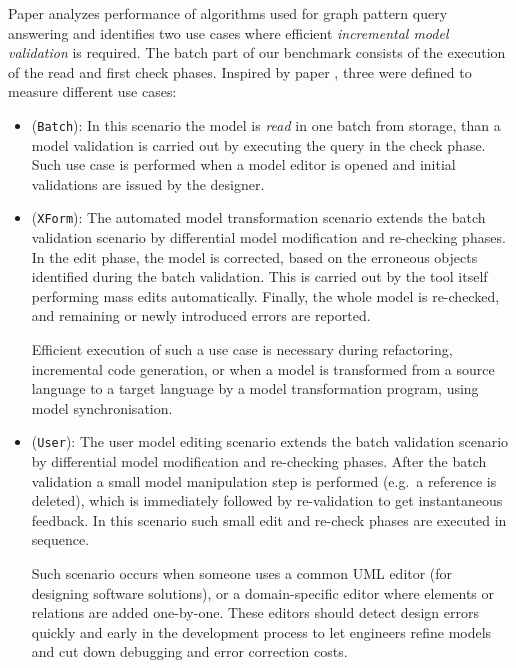 Paper \cite{icgt08-bhrv} analyzes performance of algorithms used for graph
pattern query answering and identifies two use cases where efficient
\emph{incremental model validation} is required. The batch part of our benchmark
consists of the execution of the read and first check phases. Inspired by paper
\cite{icgt08-bhrv}, three  were defined to measure different
use cases:
\begin{itemize}
  
  \item {} (\texttt{Batch}):
  In this scenario the model is \emph{read} in one batch from storage, than a model validation is carried out by executing the query in the check phase. Such use case is performed when a model editor is opened and initial validations are issued by the designer. 
  
  \item {} (\texttt{XForm}):
  The automated model transformation scenario extends the batch validation scenario by differential model modification and re-checking phases. In the edit phase, the model is corrected, based on the erroneous objects identified during the batch validation. This is carried out by the tool itself performing mass edits automatically. Finally, the whole model is re-checked, and remaining or newly introduced errors are reported. 
  
  Efficient execution of such a use case is necessary during refactoring, incremental code generation, or when a model is transformed from a source language to a target language by a model transformation program, using model synchronisation.
  
  \item {} (\texttt{User}):
  The user model editing scenario extends the batch validation scenario by differential model modification and re-checking phases. After the batch validation a small model manipulation step is performed (e.g.\ a reference is deleted), which is immediately followed by re-validation to get instantaneous feedback.  In this scenario such small edit and re-check phases are executed in sequence.
  
  Such scenario occurs when someone uses a common UML editor (for designing software solutions), or a domain-specific editor where elements or relations are added one-by-one. These editors should detect design errors quickly and early in the development process to let engineers refine models and cut down debugging and error correction costs.
  
\end{itemize}


